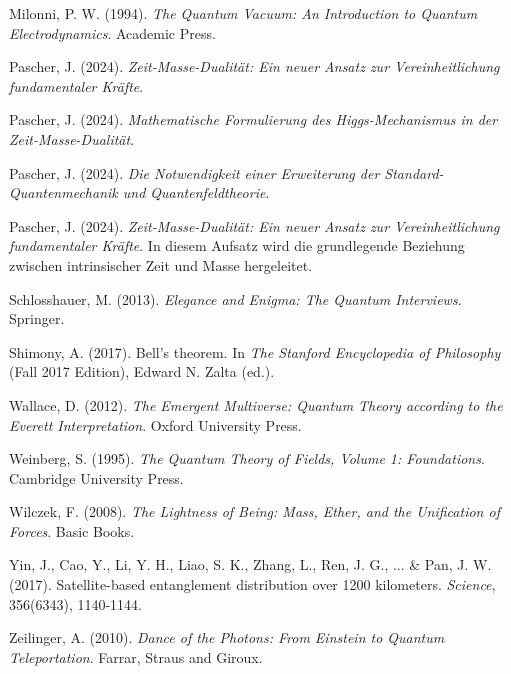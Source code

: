 \documentclass[a4paper,12pt]{article}
\begin{document}
\begin{thebibliography}{99}
		 Milonni, P. W. (1994). \textit{The Quantum Vacuum: An Introduction to Quantum Electrodynamics}. Academic Press.
		
		 Pascher, J. (2024). \textit{Zeit-Masse-Dualität: Ein neuer Ansatz zur Vereinheitlichung fundamentaler Kräfte}.
		
		 Pascher, J. (2024). \textit{Mathematische Formulierung des Higgs-Mechanismus in der Zeit-Masse-Dualität}.
		
		 Pascher, J. (2024). \textit{Die Notwendigkeit einer Erweiterung der Standard-Quantenmechanik und Quantenfeldtheorie}.
		
		 Pascher, J. (2024). \textit{Zeit-Masse-Dualität: Ein neuer Ansatz zur Vereinheitlichung fundamentaler Kräfte}. In diesem Aufsatz wird die grundlegende Beziehung zwischen intrinsischer Zeit und Masse hergeleitet.
		
		 Schlosshauer, M. (2013). \textit{Elegance and Enigma: The Quantum Interviews}. Springer.
		
		 Shimony, A. (2017). Bell's theorem. In \textit{The Stanford Encyclopedia of Philosophy} (Fall 2017 Edition), Edward N. Zalta (ed.).
		
		 Wallace, D. (2012). \textit{The Emergent Multiverse: Quantum Theory according to the Everett Interpretation}. Oxford University Press.
		
		 Weinberg, S. (1995). \textit{The Quantum Theory of Fields, Volume 1: Foundations}. Cambridge University Press.
		
		 Wilczek, F. (2008). \textit{The Lightness of Being: Mass, Ether, and the Unification of Forces}. Basic Books.
		
		 Yin, J., Cao, Y., Li, Y. H., Liao, S. K., Zhang, L., Ren, J. G., ... \& Pan, J. W. (2017). Satellite-based entanglement distribution over 1200 kilometers. \textit{Science}, 356(6343), 1140-1144.
		
		 Zeilinger, A. (2010). \textit{Dance of the Photons: From Einstein to Quantum Teleportation}. Farrar, Straus and Giroux.
		
	\end{thebibliography}
	
\end{document}
